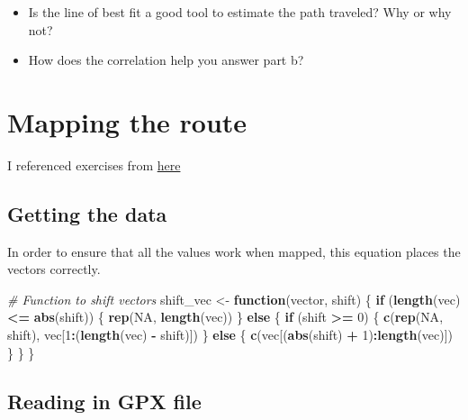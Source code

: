 \documentclass[
]{article}
\newenvironment{Shaded}{\begin{snugshade}}{\end{snugshade}}
\newcommand{\CommentTok}[1]{\textcolor[rgb]{0.56,0.35,0.01}{\textit{#1}}}
\newcommand{\ControlFlowTok}[1]{\textcolor[rgb]{0.13,0.29,0.53}{\textbf{#1}}}
\newcommand{\DecValTok}[1]{\textcolor[rgb]{0.00,0.00,0.81}{#1}}
\newcommand{\KeywordTok}[1]{\textcolor[rgb]{0.13,0.29,0.53}{\textbf{#1}}}
\newcommand{\NormalTok}[1]{#1}
\newcommand{\OperatorTok}[1]{\textcolor[rgb]{0.81,0.36,0.00}{\textbf{#1}}}
\newcommand{\OtherTok}[1]{\textcolor[rgb]{0.56,0.35,0.01}{#1}}
\newcommand{\StringTok}[1]{\textcolor[rgb]{0.31,0.60,0.02}{#1}}
\providecommand{\tightlist}{%
  \setlength{\itemsep}{0pt}\setlength{\parskip}{0pt}}
\begin{document}
\begin{itemize}
\tightlist
\item
  Is the line of best fit a good tool to estimate the path traveled? Why
  or why not?
\item
  How does the correlation help you answer part b?
\end{itemize}

\hypertarget{mapping-the-route}{%
\section{Mapping the route}\label{mapping-the-route}}

I referenced exercises from \href{https://rpubs.com/ials2un/gpx1}{here}

\hypertarget{getting-the-data}{%
\subsection{Getting the data}\label{getting-the-data}}

In order to ensure that all the values work when mapped, this equation
places the vectors correctly.

\begin{Shaded}
\begin{Highlighting}[]
\CommentTok{# Function to shift vectors}
\NormalTok{shift_vec <-}\StringTok{ }\ControlFlowTok{function}\NormalTok{(vector, shift) \{}
  \ControlFlowTok{if}\NormalTok{ (}\KeywordTok{length}\NormalTok{(vec) }\OperatorTok{<=}\StringTok{ }\KeywordTok{abs}\NormalTok{(shift)) \{}
    \KeywordTok{rep}\NormalTok{(}\OtherTok{NA}\NormalTok{, }\KeywordTok{length}\NormalTok{(vec))}
\NormalTok{  \} }\ControlFlowTok{else}\NormalTok{ \{}
    \ControlFlowTok{if}\NormalTok{ (shift }\OperatorTok{>=}\StringTok{ }\DecValTok{0}\NormalTok{) \{}
      \KeywordTok{c}\NormalTok{(}\KeywordTok{rep}\NormalTok{(}\OtherTok{NA}\NormalTok{, shift), vec[}\DecValTok{1}\OperatorTok{:}\NormalTok{(}\KeywordTok{length}\NormalTok{(vec) }\OperatorTok{-}\StringTok{ }\NormalTok{shift)])}
\NormalTok{    \} }\ControlFlowTok{else}\NormalTok{ \{}
      \KeywordTok{c}\NormalTok{(vec[(}\KeywordTok{abs}\NormalTok{(shift) }\OperatorTok{+}\StringTok{ }\DecValTok{1}\NormalTok{)}\OperatorTok{:}\KeywordTok{length}\NormalTok{(vec)])}
\NormalTok{    \}}
\NormalTok{  \}}
\NormalTok{\}}
\end{Highlighting}
\end{Shaded}

\hypertarget{reading-in-gpx-file}{%
\subsection{Reading in GPX file}\label{reading-in-gpx-file}}
\end{document}
